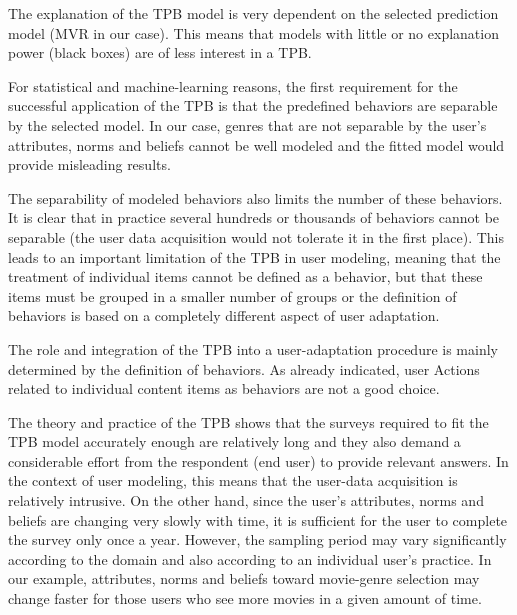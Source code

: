 \documentclass{llncs}
\begin{document}
The explanation of the TPB model is very dependent on the selected prediction model (MVR in our case). This means that models with little or no explanation power (black boxes) are of less interest in a TPB.%


\vspace{0.6em}
  For statistical and machine-learning reasons, the first requirement for the successful application of the TPB is that the predefined behaviors are separable by the selected model. In our case, genres that are not separable by the user’s attributes, norms and beliefs cannot be well modeled and the fitted model would provide misleading results.

The separability of modeled behaviors also limits the number of these behaviors. It is clear that in practice several hundreds or thousands of behaviors cannot be separable (the user data acquisition would not tolerate it in the first place). This leads to an important limitation of the TPB in user modeling, meaning that the treatment of individual items cannot be defined as a behavior, but that these items must be grouped in a smaller number of groups or the definition of behaviors is based on a completely different aspect of user adaptation. 

\vspace{0.6em}
 The role and integration of the TPB into a user-adaptation procedure is mainly determined by the definition of behaviors. As already indicated, user Actions related to individual content items as behaviors are not a good choice.

\vspace{0.6em}
 The theory and practice of the TPB shows that the surveys required to fit the TPB model accurately enough are relatively long and they also demand a considerable effort from the respondent (end user) to provide relevant answers. In the context of user modeling, this means that the user-data acquisition is relatively intrusive. On the other hand, since the user’s attributes, norms and beliefs are changing very slowly with time, it is sufficient for the user to complete the survey only once a year. However, the sampling period may vary significantly according to the domain and also according to an individual user’s practice. In our example, attributes, norms and beliefs toward movie-genre selection may change faster for those users who see more movies in a given amount of time.
\end{document}
